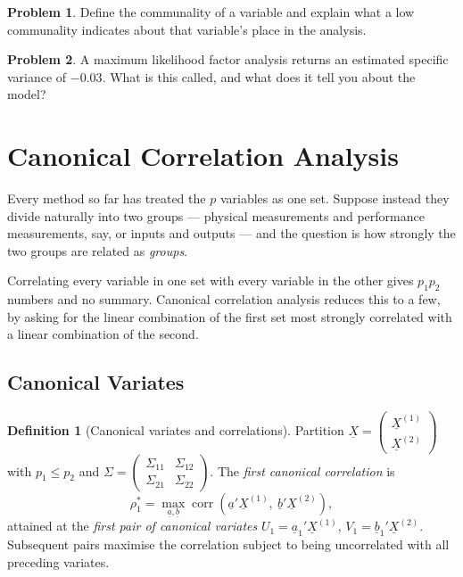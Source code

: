 \documentclass[11pt,a4paper]{article}
\theoremstyle{definition}
\newtheorem{defn}[thm]{Definition}
\newtheorem{problemx}{Problem}[section]
\newenvironment{problem}{\begin{problemx}}{\end{problemx}}
\begin{document}
\begin{problem}
Define the communality of a variable and explain what a low communality
indicates about that variable's place in the analysis.
\end{problem}

\begin{problem}
A maximum likelihood factor analysis returns an estimated specific variance of
$-0.03$. What is this called, and what does it tell you about the model?
\end{problem}

\section{Canonical Correlation Analysis}

Every method so far has treated the $p$ variables as one set. Suppose instead
they divide naturally into two groups --- physical measurements and performance
measurements, say, or inputs and outputs --- and the question is how strongly
the two groups are related as \emph{groups}.

Correlating every variable in one set with every variable in the other gives
$p_1p_2$ numbers and no summary. Canonical correlation analysis reduces this to
a few, by asking for the linear combination of the first set most strongly
correlated with a linear combination of the second.

\subsection{Canonical Variates}
\begin{defn}[Canonical variates and correlations]
Partition
$\underline{X} = \begin{pmatrix}\underline{X}^{(1)}\\ \underline{X}^{(2)}\end{pmatrix}$
with $p_1\leq p_2$ and
$\Sigma = \begin{pmatrix}\Sigma_{11} & \Sigma_{12}\\ \Sigma_{21} & \Sigma_{22}\end{pmatrix}$.
The \emph{first canonical correlation} is
$$\rho_1^{*} = \max_{\underline{a},\underline{b}}
\operatorname{corr}\left(\underline{a}'\underline{X}^{(1)},\
\underline{b}'\underline{X}^{(2)}\right),$$
attained at the \emph{first pair of canonical variates}
$U_1 = \underline{a}_1'\underline{X}^{(1)}$,
$V_1 = \underline{b}_1'\underline{X}^{(2)}$. Subsequent pairs maximise the
correlation subject to being uncorrelated with all preceding variates.
\end{defn}
\end{document}
